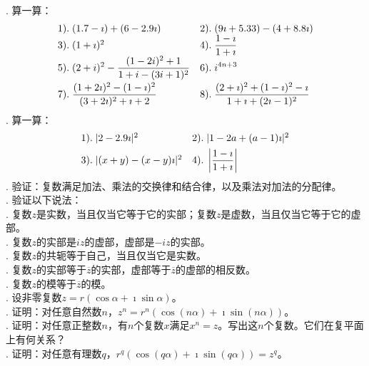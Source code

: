 \documentclass[12pt,UTF8,fontset=none]{ctexbook}
\begin{document}
\begin{xt}
    \mbox{} \\
    . 算一算：
    $$
    \begin{array}[]{ll}
        1). \;(1.7 - \imath) + (6 - 2.9\imath)   & 2).\; (9\imath + 5.33) - (4 + 8.8\imath) \\
        3). \;(1+\imath)^2                       & 4). \;\displaystyle \frac{1 - \imath}{1 + \imath} \\
        5). \;\displaystyle (2 + i)^2 - \frac{(1 - 2i)^2 + 1}{1 + i - (3i + 1)^2 }   & 6). \;\displaystyle i^{4n+3} \\[8pt]
        7). \;\displaystyle\frac{(1 + 2\imath)^2 - (1 - \imath)^2}{(3 + 2\imath)^2 + \imath + 2} & 8). \;\displaystyle\frac{(2 + \imath)^2 + (1 - \imath)^2 - \imath}{1 + \imath + (2\imath - 1)^2} \\
    \end{array}
    $$
    . 算一算：
    $$
    \begin{array}[]{ll}
        1). \;|2 - 2.9\imath|^2   & 2).\; |1 - 2a + (a - 1)\imath|^2 \\[4pt]
        3). \;|(x + y) - (x - y)\imath|^2   & 4).\;\displaystyle\left|\frac{1 - \imath}{1 + \imath} \right|\\
    \end{array}
    $$
    . 验证：复数满足加法、乘法的交换律和结合律，以及乘法对加法的分配律。\\
    . 验证以下说法：\\
    . 复数$z$是实数，当且仅当它等于它的实部；复数$z$是虚数，当且仅当它等于它的虚部。\\
    . 复数$z$的实部是$iz$的虚部，虚部是$-iz$的实部。\\
    . 复数$z$的共轭等于自己，当且仅当它是实数。\\
    . 复数$z$的实部等于$\overline{z}$的实部，虚部等于$\overline{z}$的虚部的相反数。\\
    . 复数$z$的模等于$\overline{z}$的模。\\
    . 设非零复数$z = r(\cos{\alpha} + \imath\sin{\alpha})$。\\
    . 证明：对任意自然数$n$，$z^n = r^n(\cos{(n\alpha)} + \imath\sin{(n\alpha)})$。 \\
    . 证明：对任意正整数$n$，有$n$个复数$x$满足$x^n = z$。写出这$n$个复数。它们在复平面上有何关系？\\
    . 证明：对任意有理数$q$，$r^q(\cos{(q\alpha)} + \imath\sin{(q\alpha)}) = z^q$。 \\

\end{xt}
\end{document}
